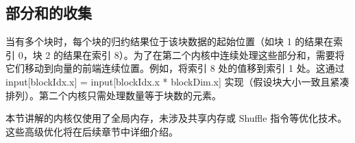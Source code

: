 \subsection{部分和的收集}

当有多个块时，每个块的归约结果位于该块数据的起始位置（如块 1 的结果在索引 0，块 2 的结果在索引 8）。为了在第二个内核中连续处理这些部分和，需要将它们移动到向量的前端连续位置。例如，将索引 8 处的值移到索引 1 处。这通过 input[blockIdx.x] = input[blockIdx.x * blockDim.x] 实现（假设块大小一致且紧凑排列）。第二个内核只需处理数量等于块数的元素。

本节讲解的内核仅使用了全局内存，未涉及共享内存或 Shuffle 指令等优化技术。这些高级优化将在后续章节中详细介绍。
